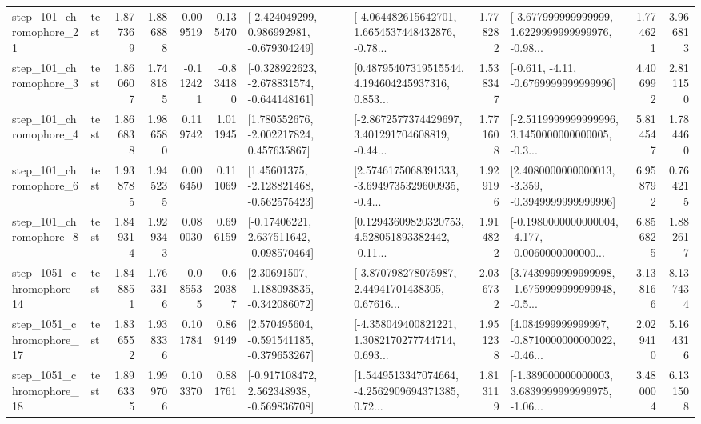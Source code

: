 \begin{tabular}{llrrrrllrlrr}
  step\_101\_chromophore\_21 &      test &      1.877369 &    1.886888 &      0.009519 &  0.135470 &   [-2.424049299, 0.986992981, -0.679304249] &  [-4.064482615642701, 1.6654537448432876, -0.78... &       1.778282 &  [-3.677999999999999, 1.6229999999999976, -0.98... &            1.774621 &          3.966813 \\
   step\_101\_chromophore\_3 &      test &      1.860607 &    1.748185 &     -0.112421 & -0.834180 &  [-0.328922623, -2.678831574, -0.644148161] &  [0.48795407319515544, 4.194604245937316, 0.853... &       1.538347 &               [-0.611, -4.11, -0.6769999999999996] &            4.406992 &          2.811150 \\
   step\_101\_chromophore\_4 &      test &      1.866838 &    1.986580 &      0.119742 &  1.011945 &    [1.780552676, -2.002217824, 0.457635867] &  [-2.8672577374429697, 3.401291704608819, -0.44... &       1.771608 &  [-2.5119999999999996, 3.1450000000000005, -0.3... &            5.814547 &          1.784460 \\
   step\_101\_chromophore\_6 &      test &      1.938785 &    1.945235 &      0.006450 &  0.111069 &    [1.45601375, -2.128821468, -0.562575423] &  [2.5746175068391333, -3.6949735329600935, -0.4... &       1.929196 &  [2.4080000000000013, -3.359, -0.3949999999999996] &            6.958792 &          0.764215 \\
   step\_101\_chromophore\_8 &      test &      1.849314 &    1.929343 &      0.080030 &  0.696159 &    [-0.17406221, 2.637511642, -0.098570464] &  [0.12943609820320753, 4.528051893382442, -0.11... &       1.914822 &  [-0.1980000000000004, -4.177, -0.0060000000000... &            6.856825 &          1.882617 \\
 step\_1051\_chromophore\_14 &      test &      1.848851 &    1.763316 &     -0.085535 & -0.620387 &    [2.30691507, -1.188093835, -0.342086072] &  [-3.870798278075987, 2.44941701438305, 0.67616... &       2.036732 &  [3.7439999999999998, -1.6759999999999948, -0.5... &            3.138166 &          8.137434 \\
 step\_1051\_chromophore\_17 &      test &      1.836552 &    1.938336 &      0.101784 &  0.869149 &   [2.570495604, -0.591541185, -0.379653267] &  [-4.358049400821221, 1.3082170277744714, 0.693... &       1.951238 &  [4.084999999999997, -0.8710000000000022, -0.46... &            2.029410 &          5.164316 \\
 step\_1051\_chromophore\_18 &      test &      1.896335 &    1.999706 &      0.103370 &  0.881761 &   [-0.917108472, 2.562348938, -0.569836708] &  [1.5449513347074664, -4.2562909694371385, 0.72... &       1.813119 &  [-1.389000000000003, 3.6839999999999975, -1.06... &            3.480004 &          6.131508 \\

\end{tabular}
